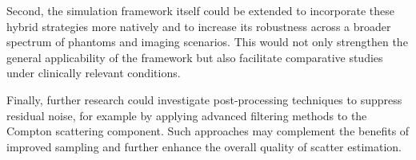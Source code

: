 Second, the simulation framework itself could be extended to incorporate these
hybrid strategies more natively and to increase its robustness across a broader
spectrum of phantoms and imaging scenarios. This would not only strengthen the
general applicability of the framework but also facilitate comparative studies
under clinically relevant conditions.

Finally, further research could investigate post-processing techniques to
suppress residual noise, for example by applying advanced filtering methods to
the Compton scattering component. Such approaches may complement the benefits of
improved sampling and further enhance the overall quality of scatter estimation.